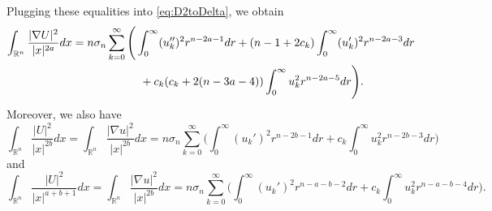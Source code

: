 \documentclass[a4paper,12pt]{article}
\theoremstyle{plain}
\theoremstyle{definition}
\theoremstyle{remark}
\def\R{\mathbb R}%
\def\irn{\int_{\R^n}}
\numberwithin{equation}{section}
\begin{document}
Plugging these equalities into \eqref{eq:D2toDelta}, we obtain
\begin{align}\label{eq:integralnabla2}
\int_{\R^n} \frac{|\nabla U|^2}{|x|^{2a}} dx& = n\sigma_n \sum_{k=0}^\infty\Bigg(\int_0^\infty (u_k'')^2 r^{n-2a -1} dr + (n-1 +2c_k) \int_0^\infty (u_k')^2 r^{n-2a -3} dr\notag\\
&\qquad\qquad\qquad + c_k(c_k + 2(n-3a -4))\int_0^\infty u_k^2 r^{n -2a -5} dr\Bigg).
\end{align}  
Moreover, we also have
\begin{equation}\label{eq:nablab}
\irn \frac{|U|^2}{|x|^{2b}} dx =\irn \frac{|\nabla u|^2}{|x|^{2b}} dx=n\sigma_n \sum_{k=0}^\infty\Bigg(\int_0^\infty (u_k')^2 r^{n-2b -1} dr + c_k \int_0^\infty u_k^2 r^{n -2b -3} dr\Bigg)
\end{equation}
and
\begin{equation}\label{eq:nablaab}
\irn \frac{|U|^2}{|x|^{a+b+1}} dx =\irn \frac{|\nabla u|^2}{|x|^{2b}} dx =n\sigma_n \sum_{k=0}^\infty\Bigg(\int_0^\infty (u_k')^2 r^{n-a -b-2} dr + c_k \int_0^\infty u_k^2 r^{n -a-b -4} dr\Bigg).
\end{equation}
\end{document}
